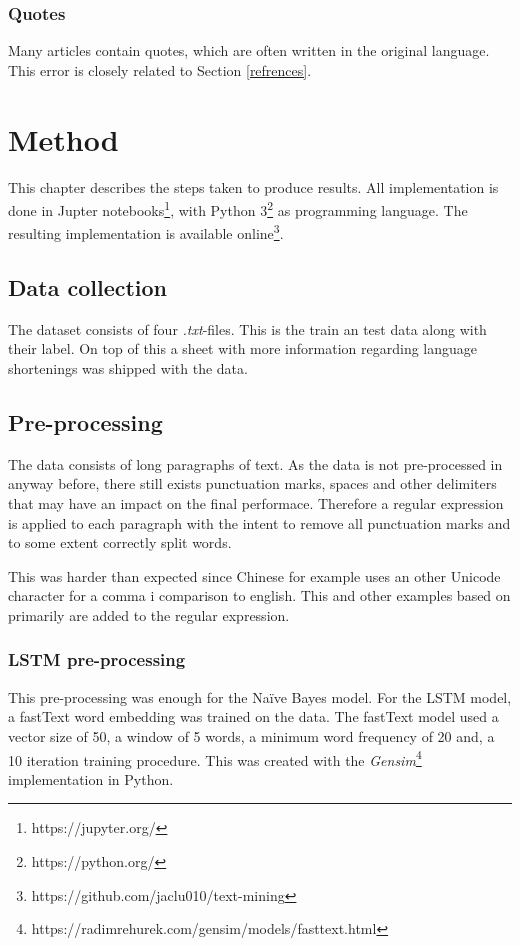 \documentclass[conference]{IEEEtran}
\begin{document}
\subsubsection{Quotes}
Many articles contain quotes, which are often written in the original language. This error is closely related to Section \ref{refrences}.



\section{Method}
This chapter describes the steps taken to produce results. All implementation is done in Jupter notebooks\footnote{https://jupyter.org/}, with Python 3\footnote{https://python.org/} as programming language. The resulting implementation is available online\footnote{https://github.com/jaclu010/text-mining}.

\subsection{Data collection}
The dataset consists of four \textit{.txt}-files. This is the train an test data along with their label. On top of this a sheet with more information regarding language shortenings was shipped with the data.

\subsection{Pre-processing}
The data consists of long paragraphs of text. As the data is not pre-processed in anyway before, there still exists punctuation marks, spaces and other delimiters that may have an impact on the final performace. Therefore a regular expression is applied to each paragraph with the intent to remove all punctuation marks and to some extent correctly split words. 

This was harder than expected since Chinese for example uses an other Unicode character for a comma i comparison to english. This and other examples based on primarily \cite{wikc, wikl, wikt} are added to the regular expression.

\subsubsection{LSTM pre-processing}
This pre-processing was enough for the Naïve Bayes model. For the LSTM model, a fastText word embedding was trained on the data. The fastText model used a vector size of 50, a window of 5 words, a minimum word frequency of 20 and, a 10 iteration training procedure. This was created with the \textit{Gensim}\footnote{https://radimrehurek.com/gensim/models/fasttext.html} implementation in Python.
\end{document}
